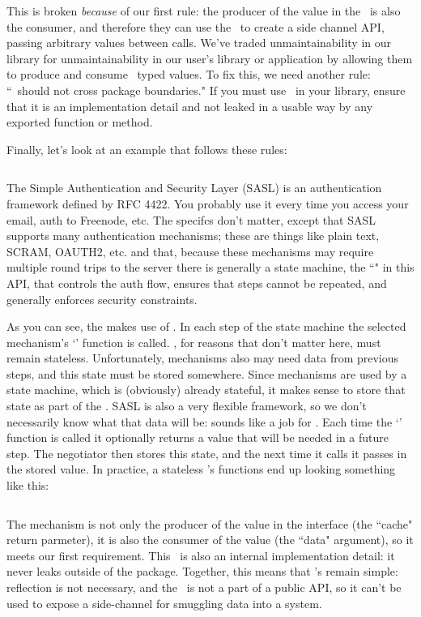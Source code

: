\documentclass{article}
\begin{document}
\inputminted{go}{example5.go}

This is broken \emph{because} of our first rule: the producer of the value in
the \interface\ is also the consumer, and therefore they can use the \interface\
to create a side channel API, passing arbitrary values between
 calls.
We've traded unmaintainability in our library for unmaintainability in our
user's library or application by allowing them to produce and consume
\interface\ typed values.
To fix this, we need another rule:
``\interface\ should not cross package boundaries."
If you must use \interface\ in your library, ensure that it is an implementation
detail and not leaked in a usable way by any exported function or method.

Finally, let's look at an example that follows these rules:

\inputminted{go}{example6.go}

The Simple Authentication and Security Layer (SASL) is an authentication
framework defined by RFC 4422.
You probably use it every time you access your email, auth to Freenode, etc.
The specifcs don't matter, except that SASL supports many authentication
mechanisms; these are things like plain text, SCRAM, OAUTH2, etc. and that,
because these mechanisms may require multiple round trips to the server there is
generally a state machine, the ``\struct{Negotiator}" in this API, that controls
the auth flow, ensures that steps cannot be repeated, and generally enforces
security constraints.

As you can see, the  makes use of \interface.
In each step of the state machine the selected mechanism's `'
function is called.
, for reasons that don't matter here, must remain stateless.
Unfortunately, mechanisms also may need data from previous steps, and this state
must be stored somewhere.
Since mechanisms are used by a state machine, which is (obviously) already
stateful, it makes sense to store that state as part of the .
SASL is also a very flexible framework, so we don't necessarily know what that
data will be: sounds like a job for \interface.
Each time the `' function is called it optionally returns a value
that will be needed in a future step.
The negotiator then stores this state, and the next time it calls 
it passes in the stored value.
In practice, a stateless 's  functions end up
looking something like this:

\pagebreak
\inputminted{go}{example7.go}

The mechanism is not only the producer of the value in the interface (the
``cache" return parmeter), it is also the consumer of the value (the ``data"
argument), so it meets our first requirement.
This \interface\ is also an internal implementation detail: it never leaks
outside of the package.
Together, this means that 's remain simple: reflection is not
necessary, and the \interface\ is not a part of a public API, so it can't be
used to expose a side-channel for smuggling data into a system.
\end{document}
